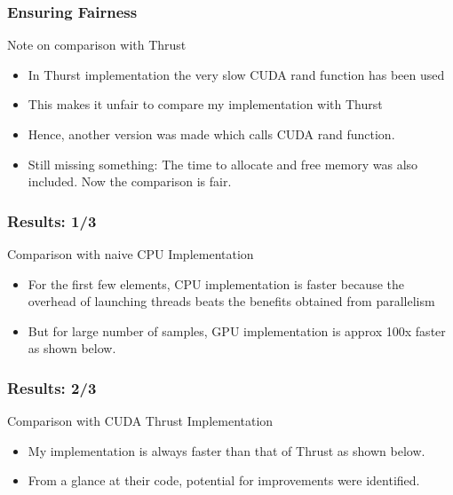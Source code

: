 \documentclass[mathserif]{beamer}
\begin{document}
\begin{frame}                                                                                                                                                                          
\frametitle{Ensuring Fairness}
\begin{block}{Note on comparison with Thrust}
\begin{itemize}
\item In Thurst implementation the very slow CUDA rand function has been used 
\item This makes it unfair to compare my implementation with Thurst 
\item Hence, another version was made which calls CUDA rand function.  
\item Still missing something: The time to allocate and free memory was also included. Now the comparison is fair.  
\end{itemize}
\end{block}
\end{frame}             
 

\begin{frame}                                                                                                                                                                          
\frametitle{Results: 1/3}
\begin{block}{Comparison with naive CPU Implementation}
\begin{itemize}
\item For the first few elements, CPU implementation is faster because the overhead of launching threads beats the benefits obtained from parallelism 
\item But for large number of samples, GPU implementation is approx 100x faster as shown below.
\end{itemize}
\end{block}
\end{frame}             
 
\begin{frame}                                                                                                                                                                          
\frametitle{Results: 2/3}

\begin{block}{Comparison with CUDA Thrust Implementation}
\begin{itemize}
\item My implementation is always faster than that of Thrust as shown below. 
\item From a glance at their code, potential for improvements were identified.  
\end{itemize}
\end{block}
\end{frame}             
 
\end{document}
